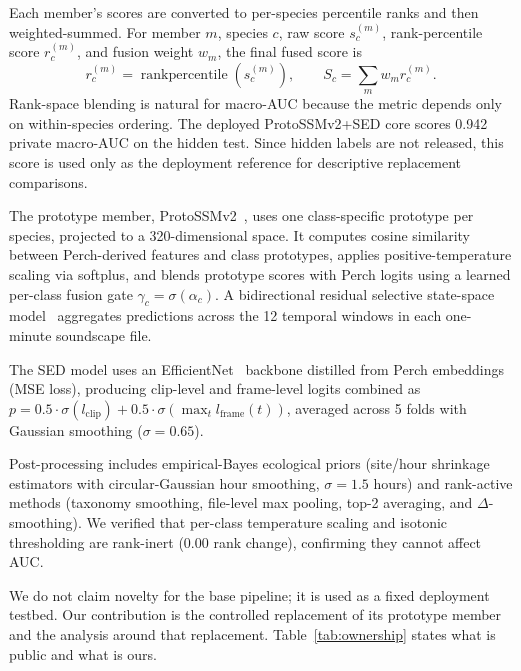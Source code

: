 \documentclass{ceurart}
\begin{document}
Each member's scores are converted to per-species percentile ranks and then weighted-summed. For member $m$, species $c$, raw score $s_c^{(m)}$, rank-percentile score $r_c^{(m)}$, and fusion weight $w_m$, the final fused score is
\[
  r_c^{(m)} = \operatorname{rankpercentile}(s_c^{(m)}), \qquad
  S_c = \sum_m w_m r_c^{(m)}.
\]
Rank-space blending is natural for macro-AUC because the metric depends only on within-species ordering. The deployed ProtoSSMv2+SED core scores 0.942 private macro-AUC on the hidden test. Since hidden labels are not released, this score is used only as the deployment reference for descriptive replacement comparisons.

The prototype member, ProtoSSMv2~\cite{protossmv2}, uses one class-specific prototype per species, projected to a 320-dimensional space. It computes cosine similarity between Perch-derived features and class prototypes, applies positive-temperature scaling via softplus, and blends prototype scores with Perch logits using a learned per-class fusion gate $\gamma_c = \sigma(\alpha_c)$. A bidirectional residual selective state-space model~\cite{gu2024mamba,gu2022s4} aggregates predictions across the 12 temporal windows in each one-minute soundscape file.


The SED model uses an EfficientNet~\cite{tan2019efficientnet} backbone distilled from Perch embeddings (MSE loss), producing clip-level and frame-level logits combined as $p = 0.5 \cdot \sigma(l_\text{clip}) + 0.5 \cdot \sigma(\max_t l_\text{frame}(t))$, averaged across 5 folds with Gaussian smoothing ($\sigma{=}0.65$).

Post-processing includes empirical-Bayes ecological priors (site/hour shrinkage estimators with circular-Gaussian hour smoothing, $\sigma{=}1.5$ hours) and rank-active methods (taxonomy smoothing, file-level max pooling, top-2 averaging, and $\Delta$-smoothing).
We verified that per-class temperature scaling and isotonic thresholding are rank-inert (0.00 rank change), confirming they cannot affect AUC.

We do not claim novelty for the base pipeline; it is used as a fixed deployment testbed. Our contribution is the controlled replacement of its prototype member and the analysis around that replacement. Table~\ref{tab:ownership} states what is public and what is ours.
\end{document}
